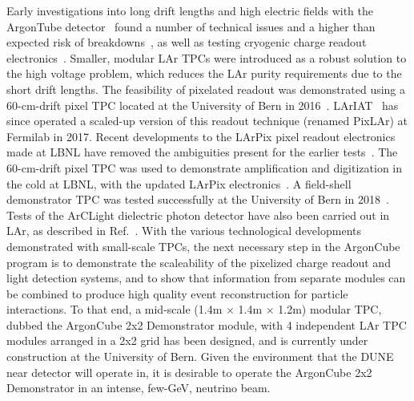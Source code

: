 Early investigations into long drift lengths and high electric fields with the ArgonTube detector~\cite{argontube_design} found a number of technical issues and a higher than expected risk of breakdowns~\cite{argontube}, as well as testing cryogenic charge readout electronics~\cite{art_cold_ero}. Smaller, modular LAr TPCs were introduced as a robust solution to the high voltage problem, which reduces the LAr purity requirements due to the short drift lengths. The feasibility of pixelated readout was demonstrated using a 60-cm-drift pixel TPC located at the University of Bern in 2016~\cite{pixels}. LArIAT~\cite{lariat} has since operated a scaled-up version of this readout technique (renamed PixLAr) at Fermilab in 2017. Recent developments to the LArPix pixel readout electronics made at LBNL have removed the ambiguities present for the earlier tests~\cite{larpix}. The 60-cm-drift pixel TPC was used to demonstrate amplification and digitization in the cold at LBNL, with the updated LArPix electronics~\cite{larpix}. A field-shell demonstrator TPC was tested successfully at the University of Bern in 2018~\addcite {}. Tests of the ArCLight dielectric photon detector have also been carried out in LAr, as described in Ref.~\cite{arclight}. With the various technological developments demonstrated with small-scale TPCs, the next necessary step in the ArgonCube program is to demonstrate the scaleability of the pixelized charge readout and light detection systems, and to show that information from separate modules can be combined to produce high quality event reconstruction for particle interactions. To that end, a mid-scale (1.4m $\times$ 1.4m $\times$ 1.2m) modular TPC, dubbed the ArgonCube 2x2 Demonstrator module, with 4 independent LAr TPC modules arranged in a 2x2 grid has been designed, and is currently under construction at the University of Bern. Given the environment that the DUNE near detector will operate in, it is desirable to operate the ArgonCube 2x2 Demonstrator in an intense, few-GeV, neutrino beam.

